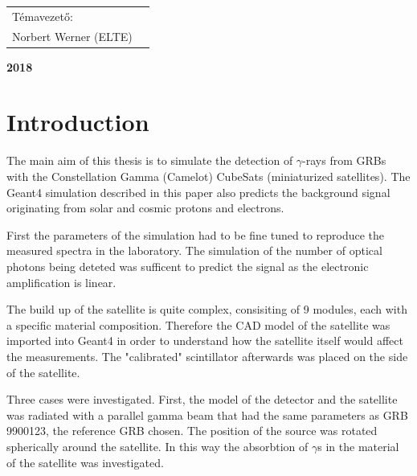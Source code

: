 \documentclass[12pt, a4paper,titlepage]{article}
\numberwithin{equation}{section}
\numberwithin{figure}{section}
\begin{document}
\begin{titlepage}
\begin{center}
\vspace{4 cm}
\end{center}

\begin{center}
\begin{tabular}{ll}
\centerline{ Témavezető: } \\
\centerline{ Norbert Werner (ELTE)}
\end{tabular}
\end{center}
\begin{center}

\vspace{2.5 cm}
\large \textbf {2018}\\
\end{center}
\end{titlepage}
\tableofcontents
{}



\pagebreak
{}
\setcounter{page}{1}




\section{Introduction}

The main aim of this thesis is to simulate the detection of $\gamma$-rays from GRBs with the Constellation Gamma (Camelot)  CubeSats (miniaturized satellites). The Geant4 simulation described in this paper also predicts the background signal originating from solar and cosmic protons and electrons. 

First the parameters of the simulation had to be fine tuned to reproduce the measured spectra in the laboratory. The simulation of the number of optical photons being deteted was sufficent to predict the signal as the electronic amplification is linear.

The build up of the satellite is quite complex, consisiting of 9 modules, each with a specific material composition. Therefore the CAD model of the satellite was imported into Geant4 in order to understand how the satellite itself would affect the measurements. The "calibrated" scintillator afterwards was placed on the side of the satellite.

Three cases were investigated. First, the model of the detector and the satellite was radiated with a parallel gamma beam that had the same parameters as GRB 9900123, the reference GRB chosen. The position of the source was rotated spherically around the satellite. In this way the absorbtion of $\gamma$s in the material of the satellite was investigated.
\end{document}
